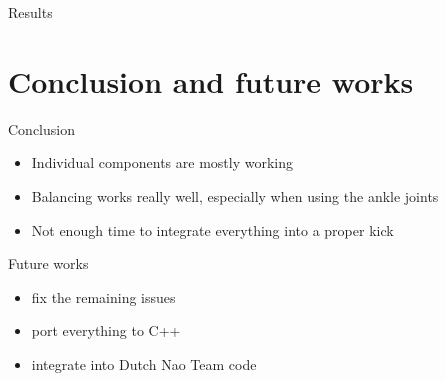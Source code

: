 \documentclass{beamer}
\begin{document}
\begin{frame}{Results}
    \begin{figure}[h]
    \end{figure}
\end{frame}
\section{Conclusion and future works}

\begin{frame}{Conclusion}
  \begin{itemize}
    \item Individual components are mostly working
    \item Balancing works really well, especially when using the ankle joints
    \item Not enough time to integrate everything into a proper kick
  \end{itemize}
\end{frame}

\begin{frame}{Future works}
  \begin{itemize}
    \item fix the remaining issues
    \item port everything to C++
    \item integrate into Dutch Nao Team code
  \end{itemize}
\end{frame}
\end{document}
